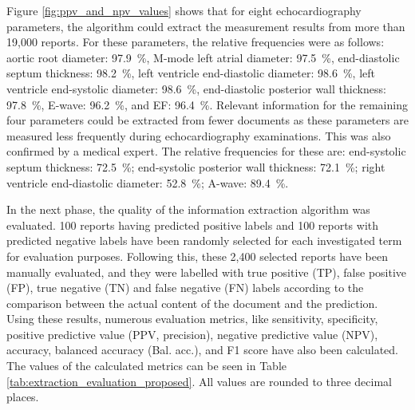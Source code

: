 Figure \ref{fig:ppv_and_npv_values} shows that for eight echocardiography parameters, the algorithm could extract the measurement results from more than 19,000 reports. For these parameters, the relative frequencies were as follows: aortic root diameter: \SI{97.9}{\percent}, M-mode left atrial diameter: \SI{97.5}{\percent}, end-diastolic septum thickness: \SI{98.2}{\percent}, left ventricle end-diastolic diameter: \SI{98.6}{\percent}, left ventricle end-systolic diameter: \SI{98.6}{\percent}, end-diastolic posterior wall thickness: \SI{97.8}{\percent}, E-wave: \SI{96.2}{\percent}, and EF: \SI{96.4}{\percent}. Relevant information for the remaining four parameters could be extracted from fewer documents as these parameters are measured less frequently during echocardiography examinations. This was also confirmed by a medical expert. The relative frequencies for these are: end-systolic septum thickness: \SI{72.5}{\percent}; end-systolic posterior wall thickness: \SI{72.1}{\percent}; right ventricle end-diastolic diameter: \SI{52.8}{\percent}; A-wave: \SI{89.4}{\percent}.

In the next phase, the quality of the information extraction algorithm was evaluated. 100 reports having predicted positive labels and 100 reports with predicted negative labels have been randomly selected for each investigated term for evaluation purposes. Following this, these 2,400 selected reports have been manually evaluated, and they were labelled with true positive (TP), false positive (FP), true negative (TN) and false negative (FN) labels according to the comparison between the actual content of the document and the prediction. Using these results, numerous evaluation metrics, like sensitivity, specificity, positive predictive value (PPV, precision), negative predictive value (NPV), accuracy, balanced accuracy (Bal. acc.), and F1 score have also been calculated. The values of the calculated metrics can be seen in Table \ref{tab:extraction_evaluation_proposed}. All values are rounded to three decimal places.

